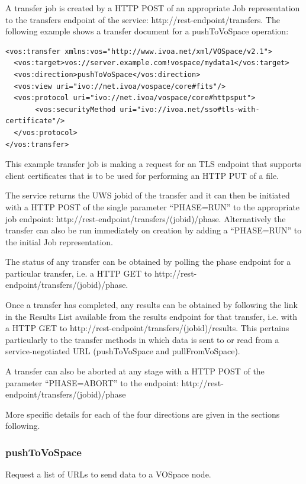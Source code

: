 \documentclass[11pt,a4paper]{ivoa}
\begin{document}
A transfer job is created by a HTTP POST of an appropriate Job representation to the transfers endpoint of the service: http://rest-endpoint/transfers.  The following example shows a transfer document for a pushToVoSpace operation:

\begin{lstlisting}
<vos:transfer xmlns:vos="http://www.ivoa.net/xml/VOSpace/v2.1">   
  <vos:target>vos://server.example.com!vospace/mydata1</vos:target>
  <vos:direction>pushToVoSpace</vos:direction>
  <vos:view uri="ivo://net.ivoa/vospace/core#fits"/>
  <vos:protocol uri="ivo://net.ivoa/vospace/core#httpsput">
       <vos:securityMethod uri="ivo://ivoa.net/sso#tls-with-certificate"/>
  </vos:protocol>
</vos:transfer>
\end{lstlisting}

This example transfer job is making a request for an TLS endpoint that supports client certificates that is to be used for performing an HTTP PUT of a file.  

The service returns the UWS jobid of the transfer and it can then be initiated with a HTTP POST of the single parameter ``PHASE=RUN'' to the appropriate job endpoint: http://rest-endpoint/transfers/(jobid)/phase. Alternatively the transfer can also be run immediately on creation by adding a ``PHASE=RUN'' to the initial Job representation.

The status of any transfer can be obtained by polling the phase endpoint for a particular transfer, i.e. a HTTP GET to http://rest-endpoint/transfers/(jobid)/phase.

Once a transfer has completed, any results can be obtained by following the link in the Results List available from the results endpoint for that transfer, i.e. with a HTTP GET to http://rest-endpoint/transfers/(jobid)/results. This pertains particularly to the transfer methods in which data is sent to or read from a service-negotiated URL (pushToVoSpace and pullFromVoSpace).

A transfer can also be aborted at any stage with a HTTP POST of the parameter ``PHASE=ABORT'' to the endpoint: http://rest-endpoint/transfers/(jobid)/phase

More specific details for each of the four directions are given in the sections following.

\subsubsection{pushToVoSpace}
\label{subsubsec:pushtovospace}
Request a list of URLs to send data to a VOSpace node.
\end{document}
